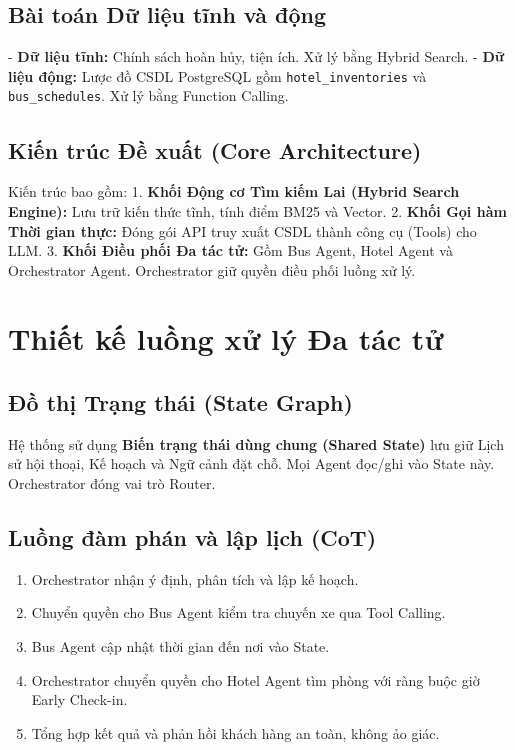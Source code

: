 \documentclass[12pt,a4paper]{report}
\begin{document}
\section{Bài toán Dữ liệu tĩnh và động}
- \textbf{Dữ liệu tĩnh:} Chính sách hoàn hủy, tiện ích. Xử lý bằng Hybrid Search.
- \textbf{Dữ liệu động:} Lược đồ CSDL PostgreSQL gồm \texttt{hotel\_inventories} và \texttt{bus\_schedules}. Xử lý bằng Function Calling.

\section{Kiến trúc Đề xuất (Core Architecture)}
Kiến trúc bao gồm:
1. \textbf{Khối Động cơ Tìm kiếm Lai (Hybrid Search Engine):} Lưu trữ kiến thức tĩnh, tính điểm BM25 và Vector.
2. \textbf{Khối Gọi hàm Thời gian thực:} Đóng gói API truy xuất CSDL thành công cụ (Tools) cho LLM.
3. \textbf{Khối Điều phối Đa tác tử:} Gồm Bus Agent, Hotel Agent và Orchestrator Agent. Orchestrator giữ quyền điều phối luồng xử lý.

\chapter{Thiết kế luồng xử lý Đa tác tử}
\section{Đồ thị Trạng thái (State Graph)}
Hệ thống sử dụng \textbf{Biến trạng thái dùng chung (Shared State)} lưu giữ Lịch sử hội thoại, Kế hoạch và Ngữ cảnh đặt chỗ. Mọi Agent đọc/ghi vào State này. Orchestrator đóng vai trò Router.

\section{Luồng đàm phán và lập lịch (CoT)}
\begin{enumerate}
    \item Orchestrator nhận ý định, phân tích và lập kế hoạch.
    \item Chuyển quyền cho Bus Agent kiểm tra chuyến xe qua Tool Calling.
    \item Bus Agent cập nhật thời gian đến nơi vào State.
    \item Orchestrator chuyển quyền cho Hotel Agent tìm phòng với ràng buộc giờ Early Check-in.
    \item Tổng hợp kết quả và phản hồi khách hàng an toàn, không ảo giác.
\end{enumerate}
\end{document}
